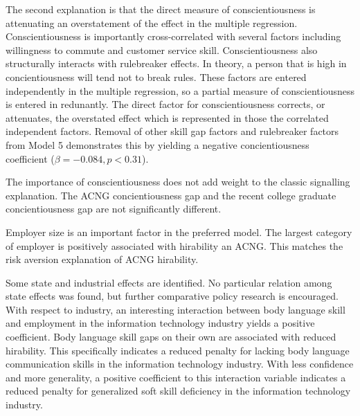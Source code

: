 \documentclass[review]{elsarticle}
\begin{document}
The second explanation is that the direct measure of conscientiousness is attenuating an overstatement of the effect in the multiple regression.
Conscientiousness is importantly cross-correlated with several factors including willingness to commute and customer service skill.
Conscientiousness also structurally interacts with rulebreaker effects.
In theory, a person that is high in concientiousness will tend not to break rules.
These factors are entered independently in the multiple regression, so a partial measure of conscientiousness is entered in redunantly.
The direct factor for conscientiousness corrects, or attenuates, the overstated effect which is represented in those the correlated independent factors.
Removal of other skill gap factors and rulebreaker factors from Model 5 demonstrates this by yielding a negative concientiousness coefficient ($\beta = -0.084, p < 0.31$).

The importance of conscientiousness does not add weight to the classic signalling explanation.
The ACNG concientiousness gap and the recent college graduate concientiousness gap are not significantly different.

Employer size is an important factor in the preferred model.
The largest category of employer is positively associated with hirability an ACNG.
This matches the risk aversion explanation of ACNG hirability.

Some state and industrial effects are identified.
No particular relation among state effects was found, but further comparative policy research is encouraged.
With respect to industry, an interesting interaction between body language skill and employment in the information technology industry yields a positive coefficient.
Body language skill gaps on their own are associated with reduced hirability.
This specifically indicates a reduced penalty for lacking body language communication skills in the information technology industry.
With less confidence and more generality, a positive coefficient to this interaction variable indicates a reduced penalty for generalized soft skill deficiency in the information technology industry.
\end{document}
